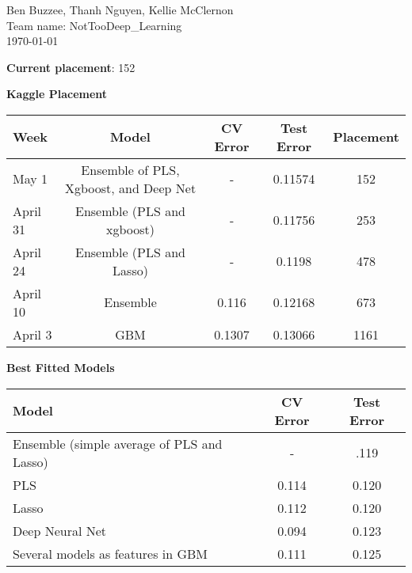 \documentclass[12pt]{article}
\begin{document}
\noindent
Ben Buzzee, Thanh Nguyen, Kellie McClernon \\
Team name: NotTooDeep\_Learning \\
\today
\vspace{0.5 cm}

\textbf{Current placement}: 152

\textbf{Kaggle Placement}
\begin{center}
\begin{tabular}{l c c c c}
\hline
Week & Model & CV Error & Test Error & Placement \\
\hline
May 1 & Ensemble of PLS, Xgboost, and Deep Net & - & 0.11574 & 152 \\
April 31 & Ensemble (PLS and xgboost) & - & 0.11756 & 253 \\
April 24 & Ensemble (PLS and Lasso) & - & 0.1198 & 478\\
April 10 & Ensemble & 0.116 & 0.12168 & 673 \\
April 3 & GBM & 0.1307 & 0.13066 & 1161 \\
\hline
\end{tabular}
\end{center}

\textbf{Best Fitted Models}
\begin{center}
\begin{tabular}{l c c}
	\hline
	Model & CV Error & Test Error \\
	\hline
	Ensemble (simple average of PLS and Lasso) & - & .119 \\
	PLS & 0.114 & 0.120 \\
	Lasso & 0.112 & 0.120 \\
	Deep Neural Net & 0.094 & 0.123 \\
	Several models as features in GBM & 0.111 & 0.125 \\
	\hline
\end{tabular}
\end{center}

\end{document}
